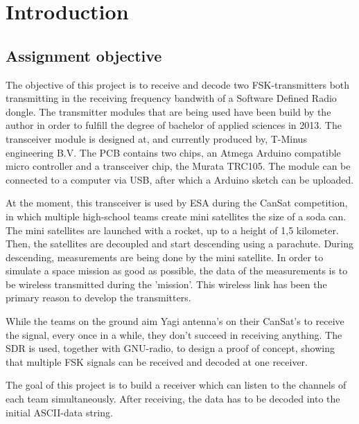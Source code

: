 \chapter{Introduction}


\section{Assignment objective} 
The objective of this project is to receive and decode two FSK-transmitters both transmitting in the receiving frequency bandwith of a Software Defined Radio dongle. The
transmitter modules that are being used have been build by the author in order to fulfill the degree of bachelor of applied sciences in 2013. The transceiver module is designed at, and currently produced by, T-Minus engineering B.V. The PCB contains two chips, an Atmega Arduino compatible micro controller and a transceiver chip, the Murata TRC105. The module can be connected to a computer via USB, after which a Arduino sketch can be uploaded.

At the moment, this transceiver is used by ESA during the CanSat competition, in which multiple high-school teams create mini satellites the size of a soda can. The mini satellites are launched with a rocket, up to a height of 1,5 kilometer. Then, the satellites are decoupled and start descending using a parachute. During descending, measurements are being done by the mini satellite. In order to simulate a space mission as good as possible, the data of the measurements is to be wireless transmitted during the 'mission'. This wireless link has been the primary reason to develop the transmitters. 

While the teams on the ground aim Yagi antenna's on their CanSat's to receive the signal, every once in a while, they don't succeed in receiving anything. The SDR is used, together with GNU-radio, to design a proof of concept, showing that multiple FSK signals can be received and decoded at one receiver. 

The goal of this project is to build a receiver which can listen to the channels of each team simultaneously. After receiving, the data has to be decoded into the initial ASCII-data string.
